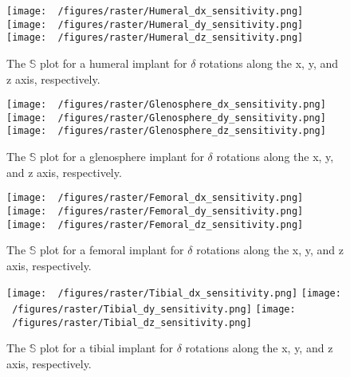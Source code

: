 \begin{figure}[h!]
	\centering
	\texttt{[image: ~/figures/raster/Humeral\_dx\_sensitivity.png]}
	\texttt{[image: ~/figures/raster/Humeral\_dy\_sensitivity.png]}
	\texttt{[image: ~/figures/raster/Humeral\_dz\_sensitivity.png]}
	\caption{The $\mathbb{S}$ plot for a humeral implant for $\delta$ rotations along the x, y, and z axis, respectively.}
	\label{fig:hum_sensitivity_plot}
\end{figure}

\begin{figure}[h!]
	\centering
	\texttt{[image: ~/figures/raster/Glenosphere\_dx\_sensitivity.png]}
	\texttt{[image: ~/figures/raster/Glenosphere\_dy\_sensitivity.png]}
	\texttt{[image: ~/figures/raster/Glenosphere\_dz\_sensitivity.png]}
	\caption{The $\mathbb{S}$ plot for a glenosphere implant for $\delta$ rotations along the x, y, and z axis, respectively.}
	\label{fig:sca_sensitivity_plot}
\end{figure}
\begin{figure}[h!]
	\centering
	\texttt{[image: ~/figures/raster/Femoral\_dx\_sensitivity.png]}
	\texttt{[image: ~/figures/raster/Femoral\_dy\_sensitivity.png]}
	\texttt{[image: ~/figures/raster/Femoral\_dz\_sensitivity.png]}
	\caption{The $\mathbb{S}$ plot for a femoral implant for $\delta$ rotations along the x, y, and z axis, respectively.}
	\label{fig:fem_sensitivity_plot}
\end{figure}
\begin{figure}[h!]
	\centering
	\texttt{[image: ~/figures/raster/Tibial\_dx\_sensitivity.png]}
	\texttt{[image: ~/figures/raster/Tibial\_dy\_sensitivity.png]}
	\texttt{[image: ~/figures/raster/Tibial\_dz\_sensitivity.png]}
	\caption{The $\mathbb{S}$ plot for a tibial implant for $\delta$ rotations along the x, y, and z axis, respectively.}
	\label{fig:tib_sensitivity_plot}
\end{figure}


